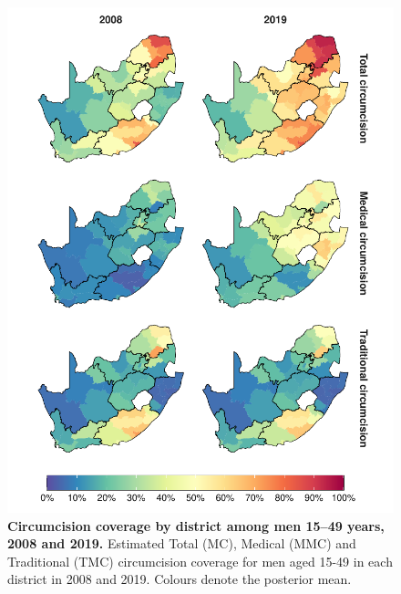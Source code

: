 \documentclass{article}
\begin{document}
\begin{figure}[H]
  \centering
  \includegraphics[width = 5.2in]{Figures/paper/Figure3.pdf}
  \caption{{\bf Circumcision coverage by district among men 15--49 years, 2008 and 2019.}
    Estimated Total (MC), Medical (MMC) and Traditional (TMC) circumcision coverage for men aged 15-49 in each district in 2008 and 2019. Colours denote the posterior mean.}
  \label{fig::district1549prevmap}
\end{figure}

\end{document}
